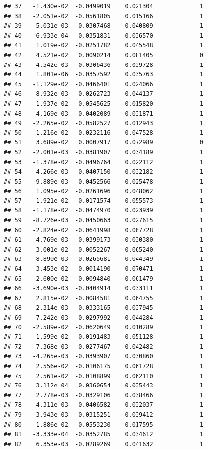 \documentclass[12pt]{article}\usepackage[]{graphicx}\usepackage[]{xcolor}
\makeatletter
\newenvironment{kframe}{%
 \def\at@end@of@kframe{}%
 \ifinner\ifhmode%
  \def\at@end@of@kframe{\end{minipage}}%
  \begin{minipage}{\columnwidth}%
 \fi\fi%
 \def\FrameCommand##1{\hskip\@totalleftmargin \hskip-\fboxsep
 \colorbox{shadecolor}{##1}\hskip-\fboxsep
     \hskip-\linewidth \hskip-\@totalleftmargin \hskip\columnwidth}%
 \MakeFramed {\advance\hsize-\width
   \@totalleftmargin\z@ \linewidth\hsize
   \@setminipage}}%
 {\par\unskip\endMakeFramed%
 \at@end@of@kframe}
\newenvironment{knitrout}{}{} %
\makeatother
\begin{document}
\begin{knitrout}
\begin{kframe}
\begin{verbatim}
## 37   -1.430e-02  -0.0499019    0.021304             1
## 38   -2.051e-02  -0.0561805    0.015166             1
## 39    5.031e-03  -0.0307468    0.040809             1
## 40    6.933e-04  -0.0351831    0.036570             1
## 41    1.019e-02  -0.0251782    0.045548             1
## 42    4.521e-02   0.0090214    0.081405             0
## 43    4.542e-03  -0.0306436    0.039728             1
## 44    1.801e-06  -0.0357592    0.035763             1
## 45   -1.129e-02  -0.0466401    0.024066             1
## 46    8.932e-03  -0.0262723    0.044137             1
## 47   -1.937e-02  -0.0545625    0.015820             1
## 48   -4.169e-03  -0.0402089    0.031871             1
## 49   -2.265e-02  -0.0582527    0.012943             1
## 50    1.216e-02  -0.0232116    0.047528             1
## 51    3.689e-02   0.0007917    0.072989             0
## 52   -2.001e-03  -0.0381907    0.034189             1
## 53   -1.378e-02  -0.0496764    0.022112             1
## 54   -4.266e-03  -0.0407150    0.032182             1
## 55   -9.889e-03  -0.0452566    0.025478             1
## 56    1.095e-02  -0.0261696    0.048062             1
## 57    1.921e-02  -0.0171574    0.055573             1
## 58   -1.178e-02  -0.0474970    0.023939             1
## 59   -8.726e-03  -0.0450663    0.027615             1
## 60   -2.824e-02  -0.0641998    0.007728             1
## 61   -4.769e-03  -0.0399173    0.030380             1
## 62    3.001e-02  -0.0052267    0.065240             1
## 63    8.890e-03  -0.0265681    0.044349             1
## 64    3.453e-02  -0.0014190    0.070471             1
## 65    2.600e-02  -0.0094840    0.061479             1
## 66   -3.690e-03  -0.0404914    0.033111             1
## 67    2.815e-02  -0.0084581    0.064755             1
## 68    2.314e-03  -0.0333165    0.037945             1
## 69    7.242e-03  -0.0297992    0.044284             1
## 70   -2.589e-02  -0.0620649    0.010289             1
## 71    1.599e-02  -0.0191483    0.051128             1
## 72    7.368e-03  -0.0277467    0.042482             1
## 73   -4.265e-03  -0.0393907    0.030860             1
## 74    2.556e-02  -0.0106175    0.061728             1
## 75    2.561e-02  -0.0108899    0.062110             1
## 76   -3.112e-04  -0.0360654    0.035443             1
## 77    2.778e-03  -0.0329106    0.038466             1
## 78   -4.311e-03  -0.0406582    0.032037             1
## 79    3.943e-03  -0.0315251    0.039412             1
## 80   -1.886e-02  -0.0553230    0.017595             1
## 81   -3.333e-04  -0.0352785    0.034612             1
## 82    6.353e-03  -0.0289269    0.041632             1

\end{verbatim}
\end{kframe}
\end{knitrout}
\end{document}
